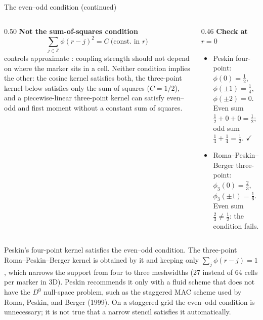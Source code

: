 \documentclass[aspectratio=169,11pt]{beamer}
\begin{document}
\begin{frame}{The even--odd condition (continued)}
\footnotesize
\setlength{\abovedisplayskip}{3pt}\setlength{\belowdisplayskip}{3pt}%
\begin{columns}[T,onlytextwidth]
\begin{column}{0.50\textwidth}
\textbf{Not the sum-of-squares condition}
\[
  \sum_{j\in\mathbb Z}\phi(r-j)^2=C\ \text{(const.\ in \(r\))}
\]
controls approximate : coupling strength should not depend on where the marker sits in a cell. Neither condition implies the other: the cosine kernel satisfies both, the three-point kernel below satisfies only the sum of squares (\(C=1/2\)), and a piecewise-linear three-point kernel can satisfy even--odd and first moment without a constant sum of squares.
\end{column}
\begin{column}{0.46\textwidth}
\textbf{Check at \(r=0\)}
\begin{itemize}\itemsep3pt
  \item Peskin four-point: \(\phi(0)=\tfrac12\), \(\phi(\pm1)=\tfrac14\), \(\phi(\pm2)=0\). Even sum \(\tfrac12+0+0=\tfrac12\); odd sum \(\tfrac14+\tfrac14=\tfrac12\). \(\checkmark\)
  \item Roma--Peskin--Berger three-point: \(\phi_3(0)=\tfrac23\), \(\phi_3(\pm1)=\tfrac16\). Even sum \(\tfrac23\neq\tfrac12\): the condition fails.
\end{itemize}
\end{column}
\end{columns}
\begin{punchbox}
\scriptsize Peskin's four-point kernel satisfies the even--odd condition. The three-point Roma--Peskin--Berger kernel is obtained by  it and keeping only \(\sum_j\phi(r-j)=1\), which narrows the support from four to three meshwidths (27 instead of 64 cells per marker in 3D). Peskin recommends it only with a fluid scheme that does not have the \(D^0\) null-space problem, such as the staggered MAC scheme used by Roma, Peskin, and Berger (1999). On a staggered grid the even--odd condition is unnecessary; it is not true that a narrow stencil satisfies it automatically.
\end{punchbox}
\end{frame}
\end{document}
